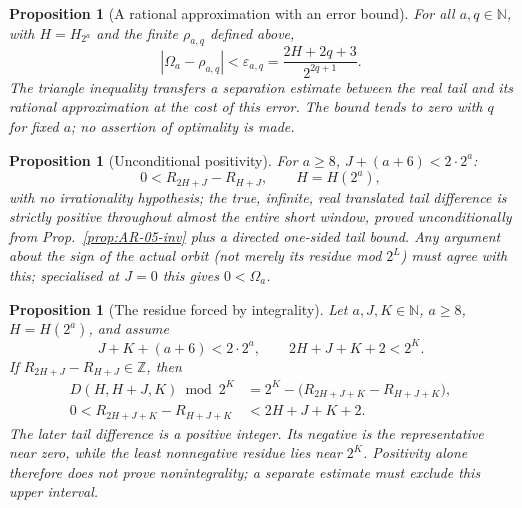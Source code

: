 \documentclass[11pt]{article}
\theoremstyle{plain}
\newtheorem{prop}[thm]{Proposition}
\theoremstyle{definition}
\theoremstyle{remark}
\begin{document}
\begin{prop}[A rational approximation with an error bound]\label{prop:SEP-02-inv}
For all $a,q\in\mathbb N$, with $H=H_{2^a}$ and the finite
$\rho_{a,q}$ defined above,
\[
 |\Omega_a-\rho_{a,q}|<\varepsilon_{a,q}
     =\frac{2H+2q+3}{2^{2q+1}}.
\]
The triangle inequality transfers a separation estimate between the
real tail and its rational approximation at the cost of this error.
The bound tends to zero with $q$ for fixed $a$; no assertion of
optimality is made.
\end{prop}

\begin{prop}[Unconditional positivity]\label{prop:SGN-01}
For $a\ge8$, $J+(a+6)<2\cdot2^a$:
\[
0 < R_{2H+J} - R_{H+J},\qquad H={H}(2^a),
\]
with no irrationality hypothesis; the true, infinite, real translated tail difference is
strictly positive throughout almost the entire short window, proved unconditionally from
Prop.~\ref{prop:AR-05-inv} plus a directed one-sided tail bound. Any argument about the sign of
the actual orbit (not merely its residue mod $2^L$) must agree with this; specialised at $J=0$
this gives $0<\Omega_a$.
\end{prop}

\begin{prop}[The residue forced by integrality]\label{prop:SGN-03}
Let $a,J,K\in\mathbb N$, $a\ge8$, $H=H(2^a)$, and assume
\[
 J+K+(a+6)<2\cdot2^a,\qquad 2H+J+K+2<2^K.
\]
If $R_{2H+J}-R_{H+J}\in\mathbb Z$, then
\[
 \begin{aligned}
 D(H,H+J,K)\bmod2^K
   &=2^K-\bigl(R_{2H+J+K}-R_{H+J+K}\bigr),\\
 0<R_{2H+J+K}-R_{H+J+K}&<2H+J+K+2.
 \end{aligned}
\]
The later tail difference is a positive integer. Its negative is the
representative near zero, while the least nonnegative residue lies near
$2^K$. Positivity alone therefore does not prove nonintegrality; a
separate estimate must exclude this upper interval.
\end{prop}
\end{document}
